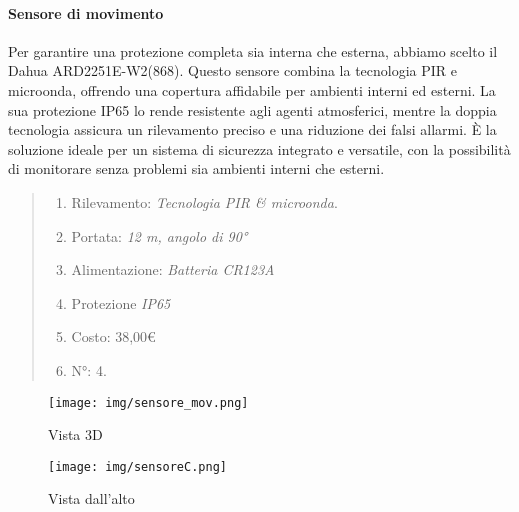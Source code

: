 \documentclass[italian, 12pt, a4paper]{article}
\begin{document}
\paragraph{Sensore di movimento}
Per garantire una protezione completa sia interna che esterna, abbiamo scelto il Dahua ARD2251E-W2(868). Questo sensore combina la tecnologia PIR e microonda, offrendo una copertura affidabile per ambienti interni ed esterni. La sua protezione IP65 lo rende resistente agli agenti atmosferici, mentre la doppia tecnologia assicura un rilevamento preciso e una riduzione dei falsi allarmi. È la soluzione ideale per un sistema di sicurezza integrato e versatile, con la possibilità di monitorare senza problemi sia ambienti interni che esterni.
\begin{quote}
    \begin{enumerate}
        \item Rilevamento: \emph{Tecnologia PIR \& microonda}.
        \item Portata: \emph{12 m, angolo di 90°}
        \item Alimentazione: \emph{Batteria CR123A}
        \item Protezione \emph{IP65}
        \item Costo: 38,00€
        \item N°: 4.
    \end{enumerate}
\end{quote}
\begin{figure}[h]
    \centering
    \begin{minipage}{0.45\textwidth}
        \centering
        \texttt{[image: img/sensore\_mov.png]}
        \caption{Vista 3D}
    \end{minipage} \hfill
    \begin{minipage}{0.45\textwidth}
        \centering
        \texttt{[image: img/sensoreC.png]}
        \caption{Vista dall'alto}
    \end{minipage}
\end{figure}
\clearpage
\end{document}
